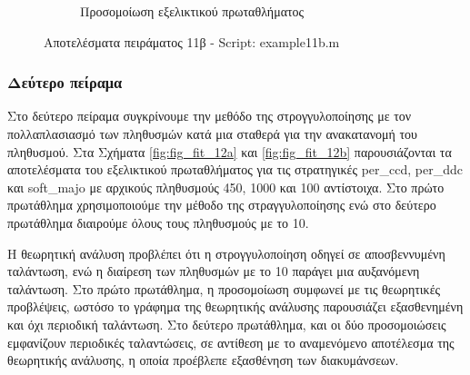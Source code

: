 \documentclass[12pt]{report}
\begin{document}
\begin{figure}[htbp]
\begin{subfigure}[b]{0.5\linewidth}
        \caption{Προσομοίωση εξελικτικού πρωταθλήματος}
        \label{fig:fig_fit_11b_c}
        
    \end{subfigure}

    \caption{Αποτελέσματα πειράματος 11β - \foreignlanguage{english}{Script: example11b.m}}
    \label{fig:fig_fit_11b}
\end{figure}

\subsubsection*{Δεύτερο πείραμα}
Στο δεύτερο πείραμα συγκρίνουμε την μεθόδο της στρογγυλοποίησης με τον πολλαπλασιασμό των πληθυσμών κατά μια σταθερά για την ανακατανομή του πληθυσμού. Στα Σχήματα \ref{fig:fig_fit_12a} και \ref{fig:fig_fit_12b} παρουσιάζονται τα αποτελέσματα του εξελικτικού πρωταθλήματος για τις στρατηγικές \foreignlanguage{english}{per\_ccd, per\_ddc} και \foreignlanguage{english}{soft\_majo} με αρχικούς πληθυσμούς 450, 1000 και 100 αντίστοιχα. Στο πρώτο πρωτάθλημα χρησιμοποιούμε την μέθοδο της στραγγυλοποίησης ενώ στο δεύτερο πρωτάθλημα διαιρούμε όλους τους πληθυσμούς με το 10.

Η θεωρητική ανάλυση προβλέπει ότι η στρογγυλοποίηση οδηγεί σε αποσβεννυμένη ταλάντωση, ενώ η διαίρεση των πληθυσμών με το 10 παράγει μια αυξανόμενη ταλάντωση.
Στο πρώτο πρωτάθλημα, η προσομοίωση συμφωνεί με τις θεωρητικές προβλέψεις, ωστόσο το γράφημα της θεωρητικής ανάλυσης παρουσιάζει εξασθενημένη και όχι περιοδική ταλάντωση.
Στο δεύτερο πρωτάθλημα, και οι δύο προσομοιώσεις εμφανίζουν περιοδικές ταλαντώσεις, σε αντίθεση με το αναμενόμενο αποτέλεσμα της θεωρητικής ανάλυσης, η οποία προέβλεπε εξασθένηση των διακυμάνσεων.
\end{document}
